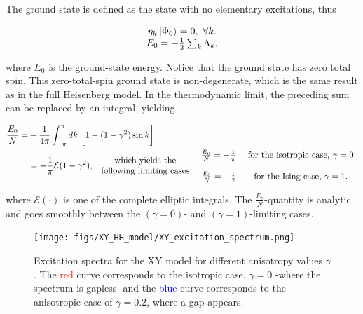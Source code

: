 \documentclass{homework}
\begin{document}
The ground state is defined as the state with no elementary excitations, thus 

\begin{equation}
\begin{array}{cc}
     \eta_{k} \ket{\Phi_0} = 0, \textnormal{ } \forall k.  \\
     E_0 = -\frac{1}{2} \sum_{k} \Lambda_k,
     \label{XY_ccyclic_gs}
\end{array}
\end{equation}

where $E_0$ is the ground-state energy. Notice that the ground state has zero total spin. This zero-total-spin ground state is non-degenerate, which is the same result as in the full Heisenberg model. 
In the thermodynamic limit, the preceding sum can be replaced by an integral, yielding 

\begin{equation}
    \begin{split}
    \frac{E_0}{N} =& -\frac{1}{4\pi} \int_{-\pi}^{\pi} dk \textnormal{ } \bigg[1 - (1-\gamma^2) \sin k \bigg] \\
    &= - \frac{1}{\pi} \mathcal{E}(1-\gamma^2),
    \begin{array}{cc}
         \textnormal{ which yields the  }  \\
         \textnormal{ following limiting cases }
    \end{array} \begin{array}{cc}
     \frac{E_0}{N} = - \frac{1}{\pi} & \textnormal{ for the isotropic case, } \gamma = 0\\ 
     \\
     \frac{E_0}{N} = - \frac{1}{2} & \textnormal{ for the Ising case, } \gamma = 1. 
\end{array}
    \end{split} 
\end{equation} 

where $\mathcal{E}(\cdot)$ is one of the complete elliptic integrals. The $\frac{E_0}{N}$-quantity is analytic and goes smoothly between the $(\gamma=0)$- and $(\gamma=1)$-limiting cases. \\

\begin{figure}
    \centering
    \texttt{[image: figs/XY\_HH\_model/XY\_excitation\_spectrum.png]}
    \caption{Excitation spectra for the XY model for different anisotropy values $\gamma$. The \textcolor{red}{red} curve corresponds to the isotropic case, $\gamma=0$ -where the spectrum is gapless- and the \textcolor{blue}{blue} curve corresponds to the anisotropic case of $\gamma = 0.2$, where a gap appears. }
    \label{fig:XY_modeL_excitation_spectra}
\end{figure}
\end{document}
